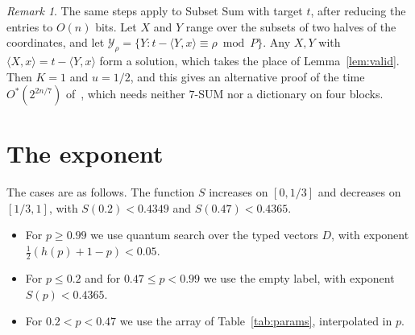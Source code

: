 \documentclass[11pt]{article}
\theoremstyle{remark}
\newtheorem{remark}[theorem]{Remark}
\newcommand{\Ys}{\mathcal Y}
\newcommand{\ip}[2]{\langle #1,#2\rangle}
\begin{document}
\begin{remark}
The same steps apply to Subset Sum with target $t$, after reducing the entries to $O(n)$ bits. Let $X$ and $Y$ range over the subsets of two halves of the coordinates, and let $\Ys_\rho=\{Y:t-\ip Yx\equiv\rho\bmod P\}$. Any $X,Y$ with $\ip Xx=t-\ip Yx$ form a solution, which takes the place of Lemma~\ref{lem:valid}. Then $K=1$ and $u=1/2$, and this gives an alternative proof of the time $O^*(2^{2n/7})$ of~\cite{CKLM26}, which needs neither $7$-SUM nor a dictionary on four blocks.
\end{remark}

\section{The exponent}\label{sec:exponent}

The cases are as follows. The function $S$ increases on $[0,1/3]$ and decreases on $[1/3,1]$, with $S(0.2)<0.4349$ and $S(0.47)<0.4365$.
\begin{itemize}[leftmargin=1.5em]
\item For $p\ge0.99$ we use quantum search over the typed vectors $D$, with exponent $\frac12(h(p)+1-p)<0.05$.
\item For $p\le0.2$ and for $0.47\le p<0.99$ we use the empty label, with exponent $S(p)<0.4365$.
\item For $0.2<p<0.47$ we use the array of Table~\ref{tab:params}, interpolated in $p$.
\end{itemize}
\end{document}
